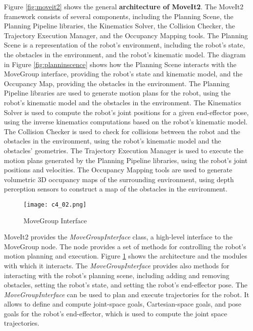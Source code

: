 Figure \ref{fig:moveit2} shows the general \textbf{architecture of MoveIt2}. The MoveIt2 framework consists of several
components, including the Planning Scene, the Planning Pipeline libraries, the Kinematics Solver, the Collision
Checker, the Trajectory Execution Manager, and the Occupancy Mapping tools.
The Planning Scene is a representation of the robot's environment, including the robot's state, the obstacles in the
environment, and the robot's kinematic model. The diagram in Figure \ref{fig:planninscence} shows how the Planning Scene
interacts with the MoveGroup interface, providing the robot's state and kinematic model, and the Occupancy Map,
providing the obstacles in the environment. The Planning Pipeline libraries are used to generate motion plans
for the robot, using the robot's kinematic model and the obstacles in the environment. The Kinematics Solver is
used to compute the robot's joint positions for a given end-effector pose, using the inverse kinematics
computations based on the robot's kinematic model. The Collision Checker is used to check for collisions between
the robot and the obstacles in the environment, using the robot's kinematic model and the obstacles' geometries.
The Trajectory Execution Manager is used to execute the motion plans generated by the Planning Pipeline libraries,
using the robot's joint positions and velocities. The Occupancy Mapping tools are used to generate volumetric 3D 
occupancy maps of the surrounding environment, using depth perception sensors to construct a map
of the obstacles in the environment. 

\begin{figure}[t]
    \centering
    \texttt{[image: c4\_02.png]}
    \caption{MoveGroup Interface}
    \label{fig:move_group}
\end{figure}

MoveIt2 provides the \textit{MoveGroupInterface} class, a high-level interface to the MoveGroup node. The node
provides a set of methods for controlling the robot's motion planning and execution. 
Figure \ref{fig:move_group} shows the architecture and the modules with which it interacts.
The \textit{MoveGroupInterface} provides also methods for interacting with the robot's planning scene, 
including adding and removing obstacles, setting the robot's state, and setting the robot's end-effector pose. 
The \textit{MoveGroupInterface} can be used to plan and execute trajectories for the robot. 
It allows to define and compute joint-space goals, Cartesian-space goals,
and pose goals for the robot's end-effector, which is used to compute the joint space trajectories.

